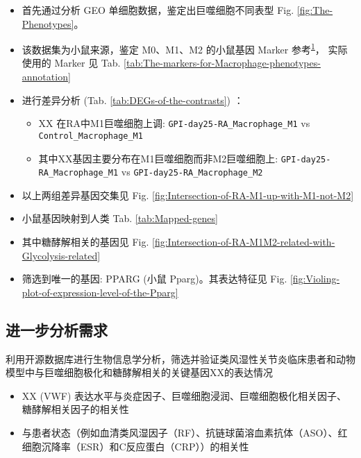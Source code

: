 \documentclass[
]{article}
\providecommand{\tightlist}{%
  \setlength{\itemsep}{0pt}\setlength{\parskip}{0pt}}
\begin{document}
\begin{itemize}
\tightlist
\item
  首先通过分析 GEO 单细胞数据，鉴定出巨噬细胞不同表型 Fig. \ref{fig:The-Phenotypes}。
\item
  该数据集为小鼠来源，鉴定 M0、M1、M2 的小鼠基因 Marker 参考\textsuperscript{\protect\hyperlink{ref-NovelMarkersTJablon2015}{1}}，
  实际使用的 Marker 见 Tab. \ref{tab:The-markers-for-Macrophage-phenotypes-annotation}
\item
  进行差异分析 (Tab. \ref{tab:DEGs-of-the-contrasts}) ：

  \begin{itemize}
  \tightlist
  \item
    XX 在RA中M1巨噬细胞上调: \texttt{GPI-day25-RA\_Macrophage\_M1} vs \texttt{Control\_Macrophage\_M1}
  \item
    其中XX基因主要分布在M1巨噬细胞而非M2巨噬细胞上: \texttt{GPI-day25-RA\_Macrophage\_M1} vs \texttt{GPI-day25-RA\_Macrophage\_M2}
  \end{itemize}
\item
  以上两组差异基因交集见 Fig. \ref{fig:Intersection-of-RA-M1-up-with-M1-not-M2}
\item
  小鼠基因映射到人类 Tab. \ref{tab:Mapped-genes}
\item
  其中糖酵解相关的基因见 Fig. \ref{fig:Intersection-of-RA-M1M2-related-with-Glycolysis-related}
\item
  筛选到唯一的基因: PPARG (小鼠 Pparg)。其表达特征见 Fig. \ref{fig:Violing-plot-of-expression-level-of-the-Pparg}
\end{itemize}

\hypertarget{ux8fdbux4e00ux6b65ux5206ux6790ux9700ux6c42}{%
\subsection{进一步分析需求}\label{ux8fdbux4e00ux6b65ux5206ux6790ux9700ux6c42}}

利用开源数据库进行生物信息学分析，筛选并验证类风湿性关节炎临床患者和动物模型中与巨噬细胞极化和糖酵解相关的关键基因XX的表达情况

\begin{itemize}
\tightlist
\item
  XX (VWF) 表达水平与炎症因子、巨噬细胞浸润、巨噬细胞极化相关因子、糖酵解相关因子的相关性
\item
  与患者状态（例如血清类风湿因子（RF）、抗链球菌溶血素抗体（ASO）、红细胞沉降率（ESR）和C反应蛋白（CRP））的相关性
\end{itemize}
\end{document}
